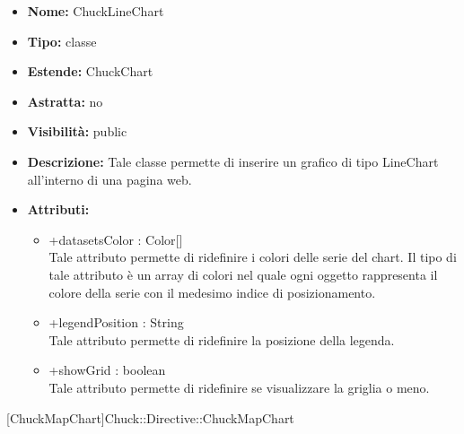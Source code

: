 			
			\begin{itemize}
			\item \textbf{Nome:} ChuckLineChart
			\item \textbf{Tipo:} classe
			
		\item \textbf{Estende:}
		ChuckChart
		\item \textbf{Astratta:}
		no
			\item \textbf{Visibilità:} public
			\item \textbf{Descrizione:} Tale classe permette di inserire un grafico di tipo LineChart all'interno di una pagina web.
			\item \textbf{Attributi:}
				\begin{itemize}
				\setlength{\itemsep}{5pt}
				
					\item[\ding{111}] {+datasetsColor : Color[]} \\ [1mm] Tale attributo permette di ridefinire i colori delle serie del chart.  Il tipo di tale attributo è un array di colori nel quale ogni oggetto rappresenta il colore della serie con il medesimo indice di posizionamento.
					\item[\ding{111}] {+legendPosition : String} \\ [1mm] Tale attributo permette di ridefinire la posizione della legenda.
					\item[\ding{111}] {+showGrid : boolean} \\ [1mm] Tale attributo permette di ridefinire se visualizzare la griglia o meno.
				\end{itemize}
		
			\end{itemize}

			
			[ChuckMapChart]{Chuck::Directive::ChuckMapChart}
			

	
